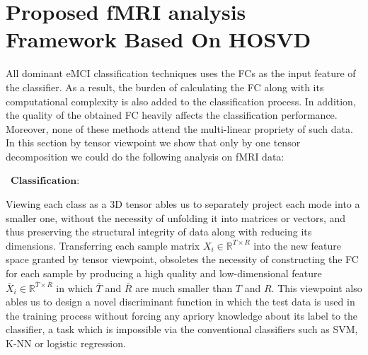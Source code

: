 \documentclass[preprint,12pt]{elsarticle}
\begin{document}
	
	
	
\section{Proposed fMRI analysis Framework Based On HOSVD}

All dominant eMCI classification techniques uses the FCs as the input feature of the classifier. As a result, the burden of calculating the FC along with its computational complexity is also added to the classification process. 
In addition, the quality of the obtained FC heavily affects the  classification performance. Moreover, none of these methods  attend  the multi-linear propriety of such data.
In this section by tensor viewpoint we show that only by one tensor decomposition we could do the following analysis on fMRI data:

\textbullet\ $\mathbf{Classification:}$

	Viewing each class as a 3D tensor ables us to separately project each mode into a smaller one, without the necessity of unfolding it into matrices or vectors, and thus preserving the structural integrity of data along with reducing its dimensions. Transferring each sample matrix $X_i\in \mathbb{R}^{T \times R}$ into the new feature space granted by tensor viewpoint, obsoletes the necessity of constructing the FC for each sample by producing a high quality and low-dimensional feature $\bar{X}_i \in \mathbb{R}^{\bar{T} \times \bar{R}}$ in which $\bar{T}$ and $\bar{R}$ are much smaller than $T$ and $R$. This viewpoint also ables us to design a novel discriminant function in which the test data is used in the training process without forcing any apriory knowledge about its label to the classifier, a task which is impossible via the conventional classifiers such as SVM, K-NN or logistic regression.  




%	
\end{document}
